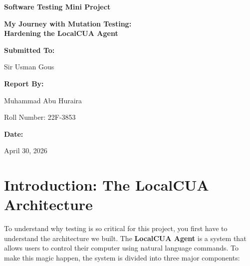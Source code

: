 \documentclass[a4paper,12pt]{article}
\begin{document}
\begin{titlepage}
    \centering
    \vspace*{2cm}
    
    {\Huge \textbf{Software Testing Mini Project} \par}
    \vspace{1.5cm}
    {\Large \textbf{My Journey with Mutation Testing: \\ Hardening the LocalCUA Agent} \par}
    
    \vspace{3.5cm}
    
    {\Large \textbf{Submitted To:} \par}
    {\Large Sir Usman Gous \par}
    
    \vspace{2.5cm}
    
    {\Large \textbf{Report By:} \par}
    {\Large Muhammad Abu Huraira \par}
    {\Large Roll Number: 22F-3853 \par}
    
    \vfill
    
    {\Large \textbf{Date:} \par}
    {\Large April 30, 2026 \par}
    
    \vspace{2cm}
\end{titlepage}

\tableofcontents
\newpage

\section{Introduction: The LocalCUA Architecture}
To understand why testing is so critical for this project, you first have to understand the architecture we built. The \textbf{LocalCUA Agent} is a system that allows users to control their computer using natural language commands. To make this magic happen, the system is divided into three major components:
\end{document}
